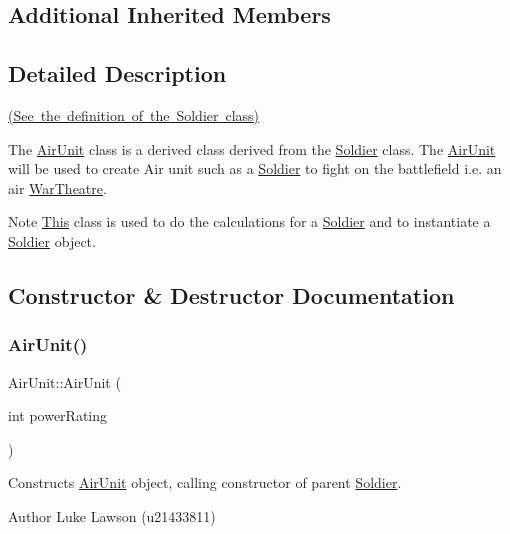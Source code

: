 \subsection*{Additional Inherited Members}


\subsection{Detailed Description}
\mbox{\hyperlink{_soldier_8h_source}{(See the definition of the Soldier class)}}

The \mbox{\hyperlink{class_air_unit}{Air\+Unit}} class is a derived class derived from the \mbox{\hyperlink{class_soldier}{Soldier}} class. The \mbox{\hyperlink{class_air_unit}{Air\+Unit}} will be used to create Air unit such as a \mbox{\hyperlink{class_soldier}{Soldier}} to fight on the battlefield i.\+e. an air \mbox{\hyperlink{class_war_theatre}{War\+Theatre}}. \begin{DoxyNote}{Note}
\mbox{\hyperlink{class_this}{This}} class is used to do the calculations for a \mbox{\hyperlink{class_soldier}{Soldier}} and to instantiate a \mbox{\hyperlink{class_soldier}{Soldier}} object. 
\end{DoxyNote}


\subsection{Constructor \& Destructor Documentation}
\mbox{\label{class_air_unit_aae4869e6b964d1ae03ab0c18cfc2631f}} 
\subsubsection{\texorpdfstring{AirUnit()}{AirUnit()}}
{\footnotesize\ttfamily Air\+Unit\+::\+Air\+Unit (\begin{DoxyParamCaption}\item[{int}]{power\+Rating }\end{DoxyParamCaption})}



Constructs \mbox{\hyperlink{class_air_unit}{Air\+Unit}} object, calling constructor of parent \mbox{\hyperlink{class_soldier}{Soldier}}. 

\begin{DoxyAuthor}{Author}
Luke Lawson (u21433811) 
\end{DoxyAuthor}

